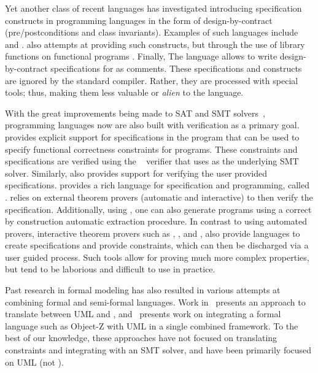 Yet another class of recent languages has investigated introducing
specification constructs in programming languages in the form of
design-by-contract (pre/postconditions and class
invariants). Examples of such languages include \eiffel{}
\cite{eiffel} and \specsharp{} \cite{barnett2011specification}. 
\scala{} also
attempts at providing such constructs, but through the use of library
functions on functional programs \cite{odersky-rv10}. Finally, The
\jml{} language \cite{jml} allows to write design-by-contract
specifications for \java{} as comments. These specifications and
constructs are ignored by the standard \java{} compiler. Rather, they
are processed with special tools; thus, making them less valuable or
{\em alien} to the language.

With the great improvements being made to SAT and SMT
solvers~\cite{smt-lib,de2008z3}, programming languages now are also
built with verification as a primary goal. \dafny{}
\cite{leino-lpar-2010} provides explicit support for specifications in
the program that can be used to specify functional correctness
constraints for programs. These constraints and specifications are
verified using the \boogie{}~\cite{barnett2006boogie} verifier that
uses \zthree{} as the underlying SMT solver. Similarly, \specsharp{}
also provides support for verifying the user provided
specifications. \whythree{} \cite{filliatre-why3-2011} provides a rich
language for specification and programming, called
\whyml{}. \whythree{} relies on external theorem provers (automatic
and interactive) to then verify the specification. Additionally, using
\whyml{}, one can also generate \ocaml{} programs using a correct by
construction automatic extraction procedure. In contrast to using
automated provers, interactive theorem provers such as \pvs{}
\cite{cade92-pvs,pvs-website}, \coq{} \cite{coq-website}, and
\isabelle{} \cite{isabelle-website}, also provide languages to create
specifications and provide constraints, which can then be discharged
via a user guided process. Such tools allow for proving much more
complex properties, but tend to be laborious and difficult to use in
practice.

Past research in formal modeling has also resulted in various attempts
at combining formal and semi-formal languages. Work
in~\cite{lausdahl2009connecting} presents an approach to translate
between UML and \vdmpp{}, and~\cite{kim2005mda} presents work on
integrating a formal language such as Object-Z with UML in a single
combined framework. To the best of our knowledge, these approaches
have not focused on translating constraints and integrating with an
SMT solver, and have been primarily focused on UML (not \sysml).

